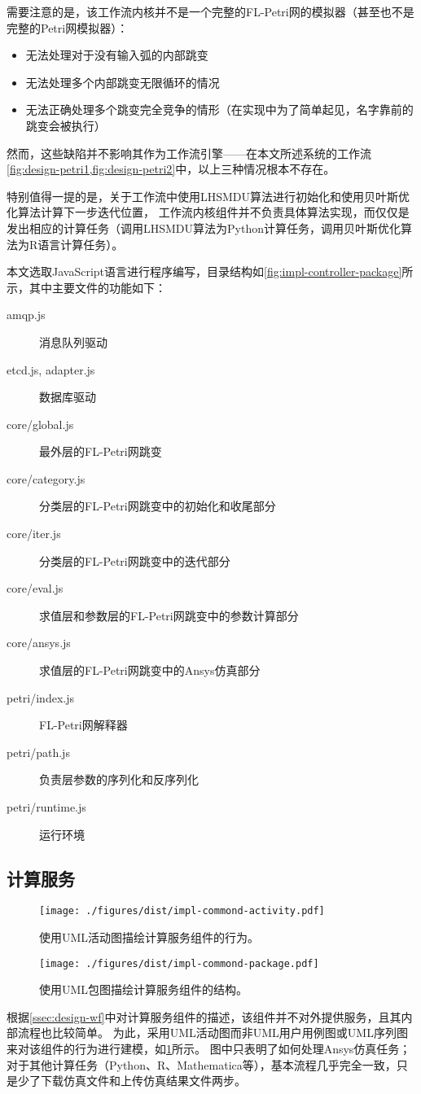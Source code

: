 \documentclass[index]{subfiles}
\begin{document}
需要注意的是，该工作流内核并不是一个完整的FL-Petri网的模拟器（甚至也不是完整的Petri网模拟器）：
\begin{itemize}
  \item 无法处理对于没有输入弧的内部跳变
  \item 无法处理多个内部跳变无限循环的情况
  \item 无法正确处理多个跳变完全竞争的情形（在实现中为了简单起见，名字靠前的跳变会被执行）
\end{itemize}
然而，这些缺陷并不影响其作为工作流引擎——在本文所述系统的工作流\cref{fig:design-petri1,fig:design-petri2}中，以上三种情况根本不存在。

特别值得一提的是，关于工作流中使用LHSMDU算法进行初始化和使用贝叶斯优化算法计算下一步迭代位置，
工作流内核组件并不负责具体算法实现，而仅仅是发出相应的计算任务（调用LHSMDU算法为Python计算任务，调用贝叶斯优化算法为R语言计算任务）。

本文选取JavaScript语言进行程序编写，目录结构如\cref{fig:impl-controller-package}所示，其中主要文件的功能如下：
\begin{description}
  \item[amqp.js] 消息队列驱动
  \item[etcd.js, adapter.js] 数据库驱动
  \item[core/global.js] 最外层的FL-Petri网跳变
  \item[core/category.js] 分类层的FL-Petri网跳变中的初始化和收尾部分
  \item[core/iter.js] 分类层的FL-Petri网跳变中的迭代部分
  \item[core/eval.js] 求值层和参数层的FL-Petri网跳变中的参数计算部分
  \item[core/ansys.js] 求值层的FL-Petri网跳变中的Ansys仿真部分
  \item[petri/index.js] FL-Petri网解释器
  \item[petri/path.js] 负责层参数的序列化和反序列化
  \item[petri/runtime.js] 运行环境
\end{description}

\subsection{计算服务}
\begin{figure}[h]
  \centering
  \texttt{[image: ./figures/dist/impl-commond-activity.pdf]}
  \caption[计算服务组件的行为]{使用UML活动图描绘计算服务组件的行为。\label{fig:impl-commond-activity}}
\end{figure}
\begin{figure}[h]
  \centering
  \texttt{[image: ./figures/dist/impl-commond-package.pdf]}
  \caption[计算服务组件的结构]{使用UML包图描绘计算服务组件的结构。\label{fig:impl-commond-package}}
\end{figure}
根据\cref{ssec:design-wf}中对计算服务组件的描述，该组件并不对外提供服务，且其内部流程也比较简单。
为此，采用UML活动图而非UML用户用例图或UML序列图来对该组件的行为进行建模，如\cref{fig:impl-commond-activity}所示。
图中只表明了如何处理Ansys仿真任务；
对于其他计算任务（Python、R、Mathematica等），基本流程几乎完全一致，只是少了下载仿真文件和上传仿真结果文件两步。
\end{document}
